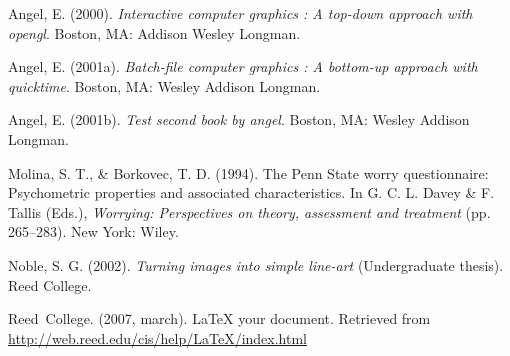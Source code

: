 \documentclass[12pt,twoside]{reedthesis}
\begin{document}
  \hypertarget{refs}{}
  \hypertarget{ref-angel2000}{}
  Angel, E. (2000). \emph{Interactive computer graphics : A top-down
  approach with opengl}. Boston, MA: Addison Wesley Longman.
  
  \hypertarget{ref-angel2001}{}
  Angel, E. (2001a). \emph{Batch-file computer graphics : A bottom-up
  approach with quicktime}. Boston, MA: Wesley Addison Longman.
  
  \hypertarget{ref-angel2002a}{}
  Angel, E. (2001b). \emph{Test second book by angel}. Boston, MA: Wesley
  Addison Longman.
  
  \hypertarget{ref-Molina1994}{}
  Molina, S. T., \& Borkovec, T. D. (1994). The Penn State worry
  questionnaire: Psychometric properties and associated characteristics.
  In G. C. L. Davey \& F. Tallis (Eds.), \emph{Worrying: Perspectives on
  theory, assessment and treatment} (pp. 265--283). New York: Wiley.
  
  \hypertarget{ref-noble2002}{}
  Noble, S. G. (2002). \emph{Turning images into simple line-art}
  (Undergraduate thesis). Reed College.
  
  \hypertarget{ref-reedweb2007}{}
  Reed~College. (2007, march). LaTeX your document. Retrieved from
  \url{http://web.reed.edu/cis/help/LaTeX/index.html}


\end{document}
